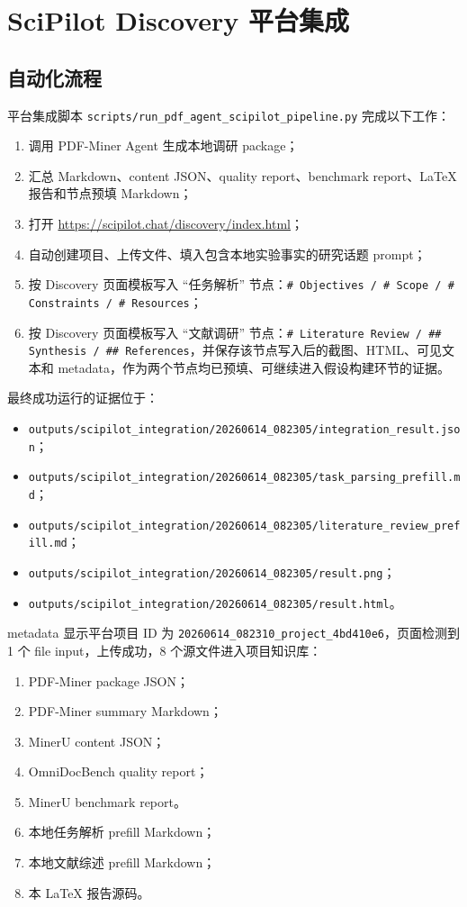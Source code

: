\documentclass[UTF8,a4paper,11pt]{ctexart}
\begin{document}
\section{SciPilot Discovery 平台集成}

\subsection{自动化流程}

平台集成脚本 \texttt{scripts/run\_pdf\_agent\_scipilot\_pipeline.py} 完成以下工作：
\begin{enumerate}
  \item 调用 PDF-Miner Agent 生成本地调研 package；
  \item 汇总 Markdown、content JSON、quality report、benchmark report、LaTeX 报告和节点预填 Markdown；
  \item 打开 \url{https://scipilot.chat/discovery/index.html}；
  \item 自动创建项目、上传文件、填入包含本地实验事实的研究话题 prompt；
  \item 按 Discovery 页面模板写入 ``任务解析'' 节点：\texttt{\# Objectives / \# Scope / \# Constraints / \# Resources}；
  \item 按 Discovery 页面模板写入 ``文献调研'' 节点：\texttt{\# Literature Review / \#\# Synthesis / \#\# References}，并保存该节点写入后的截图、HTML、可见文本和 metadata，作为两个节点均已预填、可继续进入假设构建环节的证据。
\end{enumerate}

最终成功运行的证据位于：
\begin{itemize}
  \item \texttt{outputs/scipilot\_integration/20260614\_082305/integration\_result.json}；
  \item \texttt{outputs/scipilot\_integration/20260614\_082305/task\_parsing\_prefill.md}；
  \item \texttt{outputs/scipilot\_integration/20260614\_082305/literature\_review\_prefill.md}；
  \item \texttt{outputs/scipilot\_integration/20260614\_082305/result.png}；
  \item \texttt{outputs/scipilot\_integration/20260614\_082305/result.html}。
\end{itemize}

metadata 显示平台项目 ID 为 \texttt{20260614\_082310\_project\_4bd410e6}，页面检测到 1 个 file input，上传成功，8 个源文件进入项目知识库：
\begin{enumerate}
  \item PDF-Miner package JSON；
  \item PDF-Miner summary Markdown；
  \item MinerU content JSON；
  \item OmniDocBench quality report；
  \item MinerU benchmark report。
  \item 本地任务解析 prefill Markdown；
  \item 本地文献综述 prefill Markdown；
  \item 本 LaTeX 报告源码。
\end{enumerate}
\end{document}

